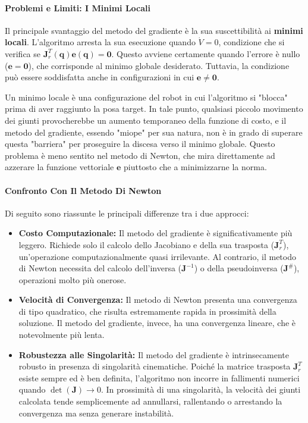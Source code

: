 ﻿\documentclass[11pt, a4paper]{article}
\begin{document}
\paragraph{Problemi e Limiti: I Minimi Locali}
Il principale svantaggio del metodo del gradiente è la sua suscettibilità ai \textbf{minimi locali}. L'algoritmo arresta la sua esecuzione quando \(\dot{V} = 0\), condizione che si verifica se \(\bm{J}_r^T(\bm{q}) \bm{e}(\bm{q}) = \bm{0}\). Questo avviene certamente quando l'errore è nullo (\(\bm{e}=\bm{0}\)), che corrisponde al minimo globale desiderato. Tuttavia, la condizione può essere soddisfatta anche in configurazioni in cui \(\bm{e} \neq \bm{0}\).

Un minimo locale è una configurazione del robot in cui l'algoritmo si "blocca" prima di aver raggiunto la posa target. In tale punto, qualsiasi piccolo movimento dei giunti provocherebbe un aumento temporaneo della funzione di costo, e il metodo del gradiente, essendo "miope" per sua natura, non è in grado di superare questa "barriera" per proseguire la discesa verso il minimo globale. Questo problema è meno sentito nel metodo di Newton, che mira direttamente ad azzerare la funzione vettoriale \(\bm{e}\) piuttosto che a minimizzarne la norma.

\paragraph{Confronto Con Il Metodo Di Newton}
Di seguito sono riassunte le principali differenze tra i due approcci:
\begin{itemize}
    \item \textbf{Costo Computazionale:} Il metodo del gradiente è significativamente più leggero. Richiede solo il calcolo dello Jacobiano e della sua trasposta (\(\bm{J}_r^T\)), un'operazione computazionalmente quasi irrilevante. Al contrario, il metodo di Newton necessita del calcolo dell'inversa (\(\bm{J}^{-1}\)) o della pseudoinversa (\(\bm{J}^{\#}\)), operazioni molto più onerose.
    \item \textbf{Velocità di Convergenza:} Il metodo di Newton presenta una convergenza di tipo quadratico, che risulta estremamente rapida in prossimità della soluzione. Il metodo del gradiente, invece, ha una convergenza lineare, che è notevolmente più lenta.
    \item \textbf{Robustezza alle Singolarità:} Il metodo del gradiente è intrinsecamente robusto in presenza di singolarità cinematiche. Poiché la matrice trasposta \(\bm{J}_r^T\) esiste sempre ed è ben definita, l'algoritmo non incorre in fallimenti numerici quando \(\det(\bm{J}) \to 0\). In prossimità di una singolarità, la velocità dei giunti calcolata tende semplicemente ad annullarsi, rallentando o arrestando la convergenza ma senza generare instabilità.
\end{itemize}
\end{document}
